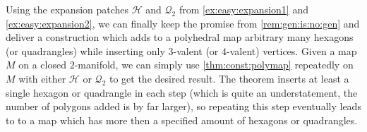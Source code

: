 \begin{example}\label{ex:easy:expansion3}
  Using the expansion patches $\mathcal{H}$ and $\mathcal{Q}_2$ from \autoref{ex:easy:expansion1} and \autoref{ex:easy:expansion2}, we can finally keep the promise from \autoref{rem:gen:is:no:gen} and deliver a construction which adds to a polyhedral map arbitrary many hexagons (or quadrangles) while inserting only $3$-valent (or $4$-valent) vertices. Given a map $M$ on a closed $2$-manifold, we can simply use \autoref{thm:const:polymap} repeatedly on $M$ with either $\mathcal{H}$ or $\mathcal{Q}_2$ to get the desired result. The theorem inserts at least a single hexagon or quadrangle in each step (which is quite an understatement, the number of polygons added is by far larger), so repeating this step eventually leads to to a map which has more then a specified amount of hexagons or quadrangles.
\end{example}

